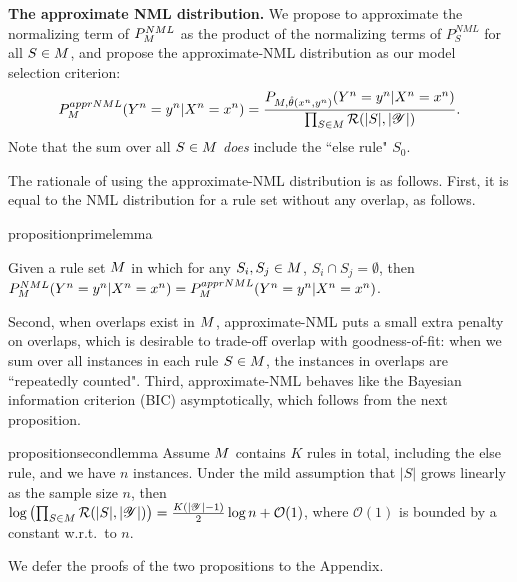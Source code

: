 \smallskip
\noindent \textbf{The approximate NML distribution.}
We propose to approximate the normalizing term of $P^{NML}_{M}$ as the product of the normalizing terms of $P^{NML}_S$ for all $S \in M$, and propose the approximate-NML distribution as our model selection criterion:
\begin{equation}
    P^{apprNML}_{M}(Y^n =y^n | X^n=x^n) = \frac{P_{M, \hat{\theta}(x^n, y^n)}(Y^n=y^n|X^n=x^n)}{\prod_{S \in M} \mathcal{R}(|S|, |\mathscr{Y}|)}.
\end{equation}
Note that the sum over all $S \in M$ \emph{does} include the ``else rule" $S_0$. 

The rationale of using the approximate-NML distribution is as follows. First, it is equal to the NML distribution for a rule set without any overlap, as follows.

\begin{restatable}{proposition}{primelemma}

Given a rule set $M$ in which for any $S_i, S_j \in M$, $S_i \cap S_j = \emptyset$, then $P^{NML}_{M}(Y^n=y^n|X^n=x^n) = P^{apprNML}_{M}(Y^n=y^n|X^n=x^n)$.
\end{restatable}

\noindent Second, when overlaps exist in $M$, approximate-NML puts a small extra penalty on overlaps, which is desirable to trade-off overlap with goodness-of-fit: when we sum over all instances in each rule $S \in M$, the instances in overlaps are ``repeatedly counted". Third, approximate-NML behaves like the Bayesian information criterion (BIC) asymptotically, which follows from the next proposition.

\begin{restatable}{proposition}{secondlemma}
Assume $M$ contains $K$ rules in total, including the else rule, and we have $n$ instances. Under the mild assumption that $|S|$ grows linearly as the sample size $n$, then \\
$\log \left(\prod_{S \in M} \mathcal{R}(|S|, |\mathscr{Y}|)\right) = \frac{K(|\mathscr{Y}| - 1)}{2} \log n + \mathcal{O}(1)$, where $\mathcal{O}(1)$ is bounded by a constant w.r.t.\ to $n$.
\end{restatable}
We defer the proofs of the two propositions to the Appendix. 

